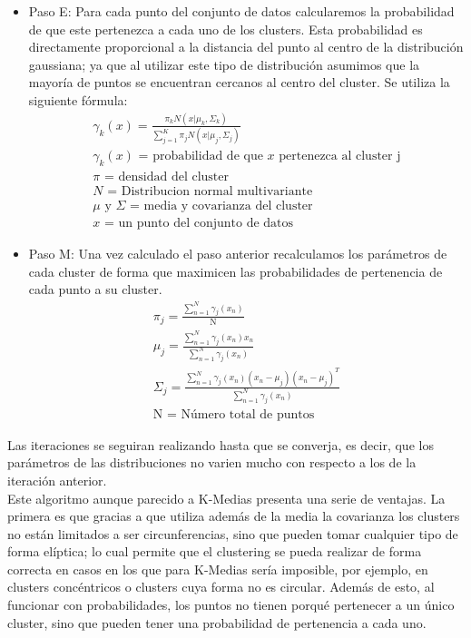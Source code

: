 \documentclass[conference,a4paper]{IEEEtran}
\begin{document}
\begin{itemize}
	\item Paso E: Para cada punto del conjunto de datos calcularemos la probabilidad de que este pertenezca a cada uno de los clusters. Esta probabilidad es directamente proporcional a la distancia del punto al centro de la distribución gaussiana; ya que al utilizar este tipo de distribución asumimos que la mayoría de puntos se encuentran cercanos al centro del cluster. Se utiliza la siguiente fórmula:
\begin{gather}
\gamma_{k}(x)=\frac{\pi_{k}\textit{N}(x|\mu_{k},\Sigma_{k})}{\sum_{j=1}^{K}\pi_{j}\textit{N}(x|\mu_{j},\Sigma_{j})}\\
\gamma_{k}(x) \text{ = probabilidad de que } x \text{ pertenezca al cluster j}\\
\pi \text{ = densidad del cluster }\\
\textit{N}\text{ = Distribucion normal multivariante}\\
\mu \text{ y } \Sigma \text{ = media y covarianza del cluster}\\
x \text{ = un punto del conjunto de datos}
\end{gather}
	\item Paso M: Una vez calculado el paso anterior recalculamos los parámetros de cada cluster de forma que maximicen las probabilidades de pertenencia de cada punto a su cluster.
\begin{gather}
\pi_{j}=\frac{\sum_{n=1}^{N}\gamma_{j}(x_{n})}{\text{N}} \\
\mu_{j}=\frac{\sum_{n=1}^{N}\gamma_{j}(x_{n})x_{n}}{\sum_{n=1}^{N}\gamma_{j}(x_{n})}\\
\Sigma_{j}=\frac{\sum_{n=1}^{N}\gamma_{j}(x_{n})(x_{n}-\mu_{j})(x_{n}-\mu_{j})^T}{\sum_{n=1}^{N}\gamma_{j}(x_{n})}\\
\text{N = Número total de puntos}
\end{gather}

\end{itemize}

Las iteraciones se seguiran realizando hasta que se converja, es decir, que los parámetros de las distribuciones no varien mucho con respecto a los de la iteración anterior.\\

Este algoritmo aunque parecido a K-Medias presenta una serie de ventajas. La primera es que gracias a que utiliza además de la media la covarianza los clusters no están limitados a ser circunferencias, sino que pueden tomar cualquier tipo de forma elíptica; lo cual permite que el clustering se pueda realizar de forma correcta en casos en los que para K-Medias sería imposible, por ejemplo, en clusters concéntricos o clusters cuya forma no es circular. Además de esto, al funcionar con probabilidades, los puntos no tienen porqué pertenecer a un único cluster, sino que pueden tener una probabilidad de pertenencia a cada uno.
\end{document}
